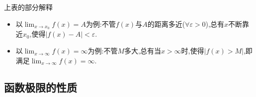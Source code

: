 \documentclass[8pt a4paper, oneside, UTF8]{ctexbook}
\begin{document}
\begin{sloppypar}
\begin{center}
\begin{tabular}{|c|c|c|c|c|}
        \end{tabular}
    \end{center}
    \begin{criterion}{上表的部分解释}{}
        \begin{itemize}
            \item 以$\lim_{x \to x_0}f(x)=A$为例:不管$f(x)$与$A$的距离多近($\forall \varepsilon >0$),总有$x$不断靠近$x_0$,使得$|f(x)-A|<\varepsilon$.
            \item 以$\lim_{x\to \infty}f(x)=\infty$为例:不管$M$多大,总有当$x>\infty$时,使得$|f(x)>M|$,即满足$\lim_{x\to \infty}f(x)=\infty$.
        \end{itemize}
    \end{criterion}
    \subsection{函数极限的性质}

\end{sloppypar}
\end{document}
